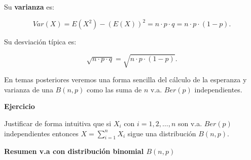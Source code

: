 \documentclass[]{book}
\begin{document}
Su \textbf{varianza} es:

\[Var(X)=E(X^2)-\left(E(X)\right)^2=n\cdot p \cdot q=n\cdot p\cdot (1-p).\]

Su desviación típica es:

\[\sqrt{n\cdot p\cdot q}=\sqrt{n\cdot p\cdot (1-p)}.\]

En temas posteriores veremos una forma sencilla del cálculo de la esperanza y varianza de una \(B(n,p)\) como las suma de \(n\) v.a. \(Ber(p)\) independientes.

\textbf{Ejercicio}

Justificar de forma intuitiva que si \(X_i\) con \(i=1,2,\ldots, n\) son v.a. \(Ber(p)\) independientes entonces \(X=\displaystyle\sum_{i=1}^n X_i\) sigue una distribución \(B(n,p).\)

\textbf{Resumen v.a con distribución binomial \(B(n,p)\)}
\end{document}

